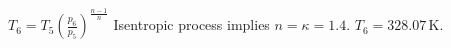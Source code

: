 \( T_6 = T_5 \left( \frac{p_6}{p_5} \right)^{\frac{n-1}{n}} \)  
Isentropic process implies \( n = \kappa = 1.4 \).  
\( T_6 = 328.07 \, \text{K} \).